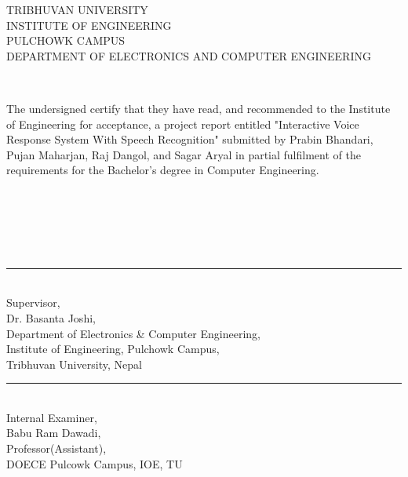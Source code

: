 \newpage
{} {}
\setcounter{page}{2}
{
  \centering

  TRIBHUVAN UNIVERSITY\\
  INSTITUTE OF ENGINEERING\\
  PULCHOWK CAMPUS\\
  DEPARTMENT OF ELECTRONICS AND COMPUTER ENGINEERING\\
}

~

The undersigned certify that they have read, and recommended to the Institute of
Engineering for acceptance, a project report entitled "Interactive Voice Response System With Speech Recognition" 
submitted by Prabin Bhandari, Pujan Maharjan, Raj Dangol, and Sagar Aryal
in partial fulfilment of the requirements for the Bachelor's degree in Computer Engineering.  

~

~

~

\begin{minipage}[t]{0.55\textwidth}
  \rule{2in}{1pt}\\
  Supervisor,\\
  Dr. Basanta Joshi,\\
  \small
  Department of Electronics \& Computer Engineering,\\
  Institute of Engineering, Pulchowk Campus,\\
  Tribhuvan University, Nepal
\end{minipage}
\hspace{0.5cm}
\begin{minipage}[t]{0.40\textwidth}
  \rule{2in}{1pt}\\
  Internal Examiner,\\
  Babu Ram Dawadi,\\
  Professor(Assistant),\\
 DOECE Pulcowk Campus, IOE, TU\\
\end{minipage}

~

~

~

